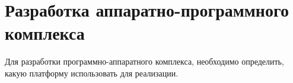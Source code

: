 \section{Разработка аппаратно-программного комплекса}

Для разработки программно-аппаратного комплекса, необходимо определить, какую платформу использовать для реализации.







% 
%
